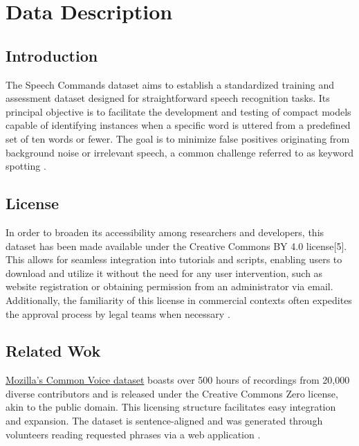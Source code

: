 %
%


\chapter{Data Description}
\label{chapter:DataDescription}

\section{Introduction}

The Speech Commands dataset aims to establish a standardized training and assessment dataset designed for straightforward speech recognition tasks. Its principal objective is to facilitate the development and testing of compact models capable of identifying instances when a specific word is uttered from a predefined set of ten words or fewer. The goal is to minimize false positives originating from background noise or irrelevant speech, a common challenge referred to as keyword spotting \cite{Warden:2018}.


\section{License}

In order to broaden its accessibility among researchers and developers, this dataset has been made available under the Creative Commons BY 4.0 license[5]. This allows for seamless integration into tutorials and scripts, enabling users to download and utilize it without the need for any user intervention, such as website registration or obtaining permission from an administrator via email. Additionally, the familiarity of this license in commercial contexts often expedites the approval process by legal teams when necessary \cite{Warden:2018}.

\section{Related Wok}

\href{https://commonvoice.mozilla.org/en}{Mozilla's Common Voice dataset} boasts over 500 hours of recordings from 20,000 diverse contributors and is released under the Creative Commons Zero license, akin to the public domain. This licensing structure facilitates easy integration and expansion. The dataset is sentence-aligned and was generated through volunteers reading requested phrases via a web application \cite{Warden:2018}.

